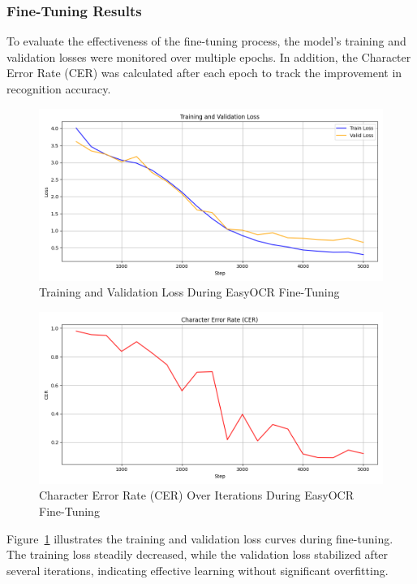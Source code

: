 \subsubsection*{Fine-Tuning Results}

To evaluate the effectiveness of the fine-tuning process, the model’s training and validation losses were monitored over multiple epochs. In addition, the Character Error Rate (CER) was calculated after each epoch to track the improvement in recognition accuracy.


\vspace{0.5cm}
\begin{figure}[H]
\centering
\includegraphics[width=0.75\linewidth]{Figures/Chapter 3/easyocr_validtrain_loss.png}
\caption{Training and Validation Loss During EasyOCR Fine-Tuning}
\label{fig:easyocr-loss-curve}
\end{figure}

\begin{figure}[H]
\centering
\includegraphics[width=0.75\linewidth]{Figures/Chapter 3/easyocr_cer.png}
\caption{Character Error Rate (CER) Over Iterations During EasyOCR Fine-Tuning}
\label{fig:easyocr-cer-curve}
\end{figure}

Figure~\ref{fig:easyocr-loss-curve} illustrates the training and validation loss curves during fine-tuning. The training loss steadily decreased, while the validation loss stabilized after several iterations, indicating effective learning without significant overfitting.

